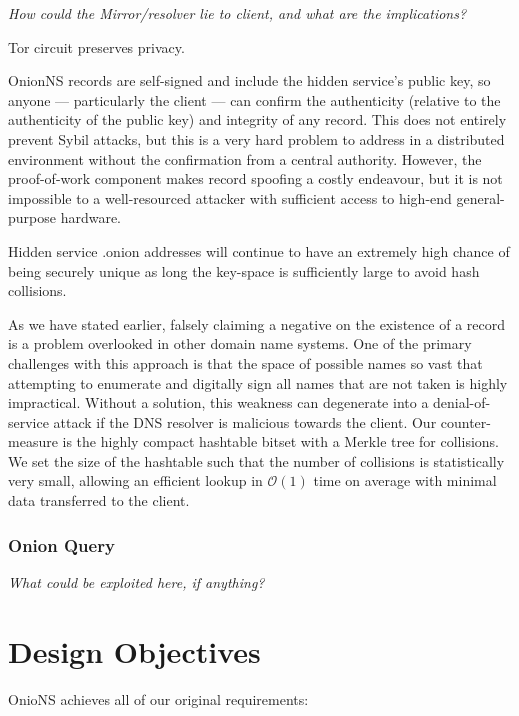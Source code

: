\emph{How could the Mirror/resolver lie to client, and what are the implications?}

Tor circuit preserves privacy.

OnionNS records are self-signed and include the hidden service's public key, so anyone --- particularly the client --- can confirm the authenticity (relative to the authenticity of the public key) and integrity of any record. This does not entirely prevent Sybil attacks, but this is a very hard problem to address in a distributed environment without the confirmation from a central authority. However, the proof-of-work component makes record spoofing a costly endeavour, but it is not impossible to a well-resourced attacker with sufficient access to high-end general-purpose hardware.

Hidden service .onion addresses will continue to have an extremely high chance of being securely unique as long the key-space is sufficiently large to avoid hash collisions.

As we have stated earlier, falsely claiming a negative on the existence of a record is a problem overlooked in other domain name systems. One of the primary challenges with this approach is that the space of possible names so vast that attempting to enumerate and digitally sign all names that are not taken is highly impractical. Without a solution, this weakness can degenerate into a denial-of-service attack if the DNS resolver is malicious towards the client. Our counter-measure is the highly compact hashtable bitset with a Merkle tree for collisions. We set the size of the hashtable such that the number of collisions is statistically very small, allowing an efficient lookup in $ \mathcal{O}(1) $ time on average with minimal data transferred to the client.

\subsubsection{Onion Query}

\emph{What could be exploited here, if anything?}

\section{Design Objectives}

OnioNS achieves all of our original requirements:

